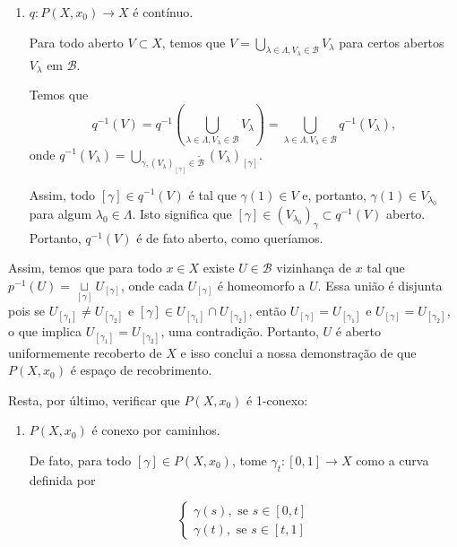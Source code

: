 \begin{dem}
\begin{enumerate}
        \item $q:P(X,x_0)\rightarrow X$ é contínuo.\newline
        
            Para todo aberto $V\subset X$, temos que $V=\underset{\lambda\in \Lambda, V_\lambda \in \mathcal{B}}{\bigcup} V_\lambda$ para certos abertos $V_\lambda$ em $\mathcal{B}$.

            Temos que $$q^{-1}(V)=q^{-1}(\underset{\lambda\in \Lambda, V_\lambda \in \mathcal{B}}{\bigcup} V_\lambda)=\underset{\lambda\in \Lambda, V_\lambda \in \mathcal{B}}{\bigcup}q^{-1}(V_\lambda),$$ onde $q^{-1}(V_\lambda)=\underset{\gamma, (V_\lambda)_[\gamma] \in \tilde{\mathcal{B}}}{\bigcup} (V_\lambda)_{[\gamma]}$.

            Assim, todo $[\gamma]\in q^{-1}(V)$ é tal que $\gamma(1)\in V$ e, portanto, $\gamma(1)\in V_{\lambda_0}$ para algum $\lambda_0\in \Lambda$. Isto significa que $[\gamma]\in (V_{\lambda_0})_\gamma\subset q^{-1}(V)$ aberto. Portanto, $q^{-1}(V)$ é de fato aberto, como queríamos.\newline\newline
     \end{enumerate}


    Assim, temos que para todo $x\in X$ existe $U\in \mathcal{B}$ vizinhança de $x$ tal que  $p^{-1}(U)=\underset{[\gamma]}{\sqcup} U_{[\gamma]}$, onde cada $U_{[\gamma]}$ é homeomorfo a $U$. Essa união é disjunta pois se $U_{[\gamma_1]}\neq U_{[\gamma_2]}$ e $[\gamma]\in U_{[\gamma_1]}\cap U_{[\gamma_2]}$, então $U_{[\gamma]}=U_{[\gamma_1]}$ e $U_{[\gamma]}=U_{[\gamma_2]}$, o que implica $U_{[\gamma_1]}=U_{[\gamma_2]}$, uma contradição. Portanto, $U$ é aberto uniformemente recoberto de $X$ e isso conclui a nossa demonstração de que $P(X,x_0)$ é espaço de recobrimento.\newline

    Resta, por último, verificar que $P(X,x_0)$ é 1-conexo:

    \begin{enumerate}
        \item $P(X,x_0)$ é conexo por caminhos.\newline
        
            De fato, para todo $[\gamma]\in P(X,x_0)$, tome $\gamma_t:[0,1]\rightarrow X$ como a curva definida por 

            $$\begin{cases}
                \gamma(s), \text{ se }s\in [0,t]\\
                \gamma(t), \text{ se }s\in [t,1]
            \end{cases}$$


\end{enumerate}
\end{dem}
